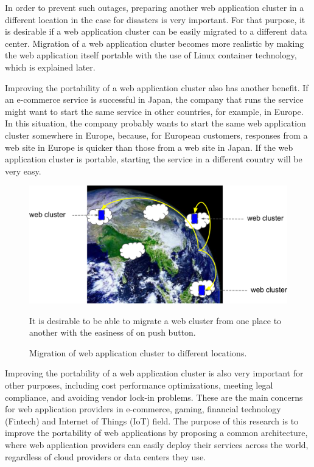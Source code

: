 In order to prevent such outages, preparing another web application cluster in a different location in the case for disasters is very important.
For that purpose, it is desirable if a web application cluster can be easily migrated to a different data center.
Migration of a web application cluster becomes more realistic by making the web application itself portable with the use of Linux container technology, which is explained later.

Improving the portability of a web application cluster also has another benefit.
If an e-commerce service is successful in Japan, the company that runs the service might want to start the same service in other countries, for example, in Europe.
In this situation, the company probably wants to start the same web application cluster somewhere in Europe, because, for European customers, responses from a web site in Europe is quicker than those from a web site in Japan.
If the web application cluster is portable, starting the service in a different country will be very easy.

\begin{figure}[h]
\begin{center}
\includegraphics[width=0.7\columnwidth]{Figs/earth}
\end{center}
\caption{
Migration of web application cluster to different locations.
}
\centering\parbox[c]{0.9\columnwidth}{
It is desirable to be able to migrate a web cluster from one place to another with the easiness of on push button.
}
\label{fig:earth}
\end{figure}

Improving the portability of a web application cluster is also very important for other purposes, including cost performance optimizations, meeting legal compliance, and avoiding vendor lock-in problems.
These are the main concerns for web application providers in e-commerce, gaming, financial technology (Fintech) and Internet of Things (IoT) field.
The purpose of this research is to improve the portability of web applications by proposing a common architecture, where web application providers can easily deploy their services across the world, regardless of cloud providers or data centers they use.

